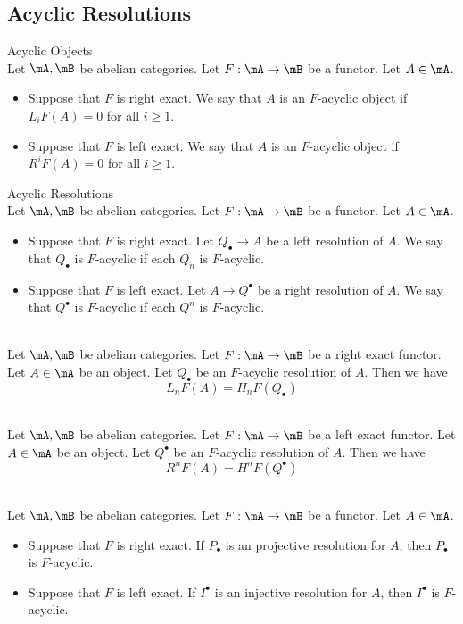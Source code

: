 \documentclass[a4paper]{article}
\begin{document}
\subsection{Acyclic Resolutions}
\begin{defn}{Acyclic Objects}{}\\
Let $\mA,\mB$ be abelian categories. Let $F:\mA\to\mB$ be a functor. Let $A\in\mA$. 
\begin{itemize}
\item Suppose that $F$ is right exact. We say that $A$ is an $F$-acyclic object if $L_iF(A)=0$ for all $i\geq 1$. 
\item Suppose that $F$ is left exact. We say that $A$ is an $F$-acyclic object if $R^iF(A)=0$ for all $i\geq 1$. 
\end{itemize}
\end{defn}

\begin{defn}{Acyclic Resolutions}{}\\
Let $\mA,\mB$ be abelian categories. Let $F:\mA\to\mB$ be a functor. Let $A\in\mA$. 
\begin{itemize}
\item Suppose that $F$ is right exact. Let $Q_\bullet\to A$ be a left resolution of $A$. We say that $Q_\bullet$ is $F$-acyclic if each $Q_n$ is $F$-acyclic. 
\item Suppose that $F$ is left exact. Let $A\to Q^\bullet$ be a right resolution of $A$. We say that $Q^\bullet$ is $F$-acyclic if each $Q^n$ is $F$-acyclic. 
\end{itemize}
\end{defn}

\begin{prp}{}{}\\
Let $\mA,\mB$ be abelian categories. Let $F:\mA\to\mB$ be a right exact functor. Let $A\in\mA$ be an object. Let $Q_\bullet$ be an $F$-acyclic resolution of $A$. Then we have $$L_nF(A)=H_nF(Q_\bullet)$$
\end{prp}

\begin{prp}{}{}\\
Let $\mA,\mB$ be abelian categories. Let $F:\mA\to\mB$ be a left exact functor. Let $A\in\mA$ be an object. Let $Q^\bullet$ be an $F$-acyclic resolution of $A$. Then we have $$R^nF(A)=H^nF(Q^\bullet)$$
\end{prp}

\begin{lmm}{}{}\\
Let $\mA,\mB$ be abelian categories. Let $F:\mA\to\mB$ be a functor. Let $A\in\mA$. 
\begin{itemize}
\item Suppose that $F$ is right exact. If $P_\bullet$ is an projective resolution for $A$, then $P_\bullet$ is $F$-acyclic. 
\item Suppose that $F$ is left exact. If $I^\bullet$ is an injective resolution for $A$, then $I^\bullet$ is $F$-acyclic. 
\end{itemize}
\end{lmm}
\end{document}
